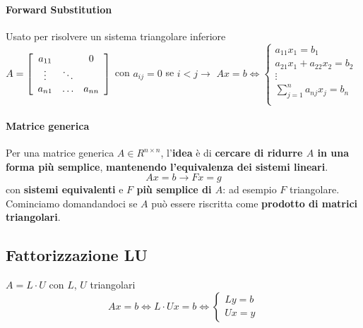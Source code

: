 \documentclass[10pt]{book}
\begin{document}
\paragraph{Forward Substitution}
Usato per risolvere un sistema triangolare inferiore\\
	\begin{math}
	A = \left[
	\begin{array}{c c c}
	a_{11} & & 0\\
	\vdots & \ddots\\
	a_{n1} & \ldots & a_{nn}
	\end{array}
	\right]
	\end{math}
	con $a_{ij} = 0$ se $i < j \rightarrow$
	\begin{math}
	Ax = b \Leftrightarrow \left\{
	\begin{array}{c}
		a_{11}x_1 = b_1\\
		a_{21}x_1 + a_{22}x_2 = b_2\\
		\vdots\\
		\sum_{j = 1}^n a_{nj}x_j = b_n\\
	\end{array}
	\right.
	\end{math}
\paragraph{Matrice generica} Per una matrice generica $A \in R^{n \times n}$, l'\textbf{idea} è di \textbf{cercare di ridurre $A$ in una forma più semplice}, \textbf{mantenendo l'equivalenza dei sistemi lineari}.
$$Ax = b \longrightarrow Fx = g$$ con \textbf{sistemi equivalenti} e \textbf{$F$ più semplice di $A$}: ad esempio $F$ triangolare.\\
Cominciamo domandandoci se $A$ può essere riscritta come \textbf{prodotto di matrici triangolari}.
\subsection{Fattorizzazione LU}
$A = L\cdot U$ con $L$, $U$ triangolari
$$Ax = b \Leftrightarrow L\cdot Ux = b \Leftrightarrow \left\{ \begin{array}{c}
	Ly = b\\
	Ux = y
\end{array}
\right.$$
\end{document}
